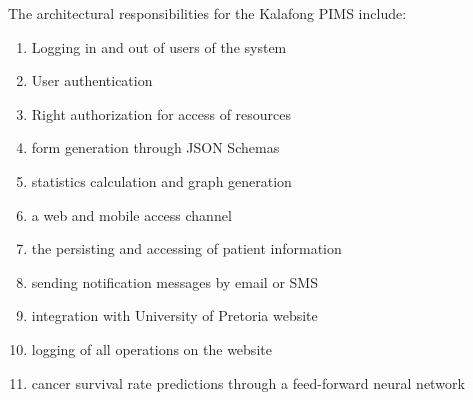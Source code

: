 The architectural responsibilities for the Kalafong PIMS include:
\begin{enumerate}
	\item Logging in and out of users of the system
	\item User authentication
	\item Right authorization for  access of resources
	\item form generation through JSON Schemas
	\item statistics calculation and graph generation
	\item a web and mobile access channel
	\item the persisting and accessing of patient information
	\item sending notification messages by email or SMS
	\item integration with University of Pretoria website
	\item logging of all operations on the website
	\item cancer survival rate predictions through a feed-forward neural network
\end{enumerate}